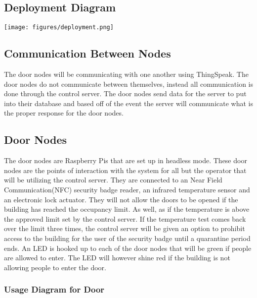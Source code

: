 \subsection{Deployment Diagram}

\texttt{[image: figures/deployment.png]}

\subsection{Communication Between Nodes}
The door nodes will be communicating with one another using ThingSpeak. The door nodes
do not communicate between themselves, instead all communication is done through the control server. The door nodes send data for the server to put into their database and based off of the event the server will communicate what is the proper response for the door nodes.

\subsection{Door Nodes}
The door nodes are Raspberry Pis that are set up in headless mode. These door nodes are the 
points of interaction with the system for all but the operator that will be utilizing the control server.
They are connected to an Near Field Communication(NFC) security badge reader, an infrared
temperature sensor and an electronic lock actuator. They will
not allow the doors to be opened if the building has reached the occupancy limit. 
As well, as if the temperature is above the approved limit set by the control server. 
If the temperature test comes back over the limit three times, the control server will be given an option to
prohibit access to the building for the user of the security badge until a quarantine period ends. 
An LED is hooked up to each of the door nodes that will be green if people are allowed to enter. 
The LED will however shine red if the building is not allowing people to enter the door.



\subsubsection{Usage Diagram for Door}

